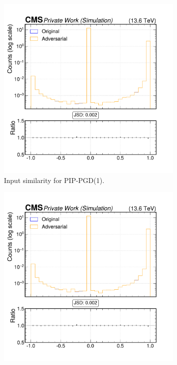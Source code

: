 \begin{figure}[h]
  \centering
  \begin{subfigure}[t]{0.32\textwidth}
    \includegraphics[width=\linewidth]{media/output/features/compare/combined_it_1/cmp_vtx_arr_sv_costhetasvpv.pdf}
    \caption*{Input similarity for PIP-PGD(1).}
  \end{subfigure}\hfill
  \begin{subfigure}[t]{0.32\textwidth}
    \includegraphics[width=\linewidth]{media/output/features/compare/combined_it_2/cmp_vtx_arr_sv_costhetasvpv.pdf}

\end{subfigure}
\end{figure}
